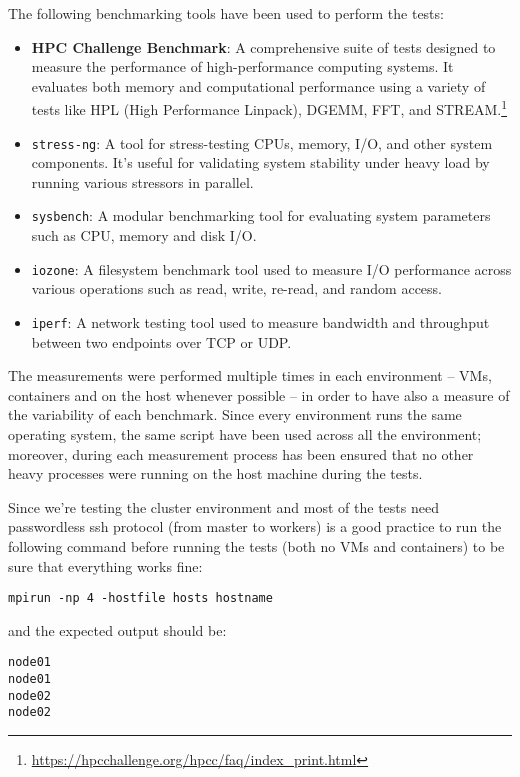 The following benchmarking tools have been used to perform the tests:

\begin{itemize}
    \item \textbf{HPC Challenge Benchmark}: A comprehensive suite of tests designed to measure the performance of high-performance computing systems. It evaluates both memory and computational performance using a variety of tests like HPL (High Performance Linpack), DGEMM, FFT, and STREAM.\footnote{\url{https://hpcchallenge.org/hpcc/faq/index_print.html}}
    \item \texttt{stress-ng}: A tool for stress-testing CPUs, memory, I/O, and other system components. It's useful for validating system stability under heavy load by running various stressors in parallel.
    \item \texttt{sysbench}: A modular benchmarking tool for evaluating system parameters such as CPU, memory and disk I/O.
    \item \texttt{iozone}: A filesystem benchmark tool used to measure I/O performance across various operations such as read, write, re-read, and random access.
    \item \texttt{iperf}: A network testing tool used to measure bandwidth and throughput between two endpoints over TCP or UDP. 
\end{itemize}

The measurements were performed multiple times in each environment -- VMs, containers and on the host whenever possible --  in order to have also a measure of the variability of each benchmark. Since every environment runs the same operating system, the same script have been used across all the environment; moreover, during each measurement process has been ensured that no other heavy processes were running on the host machine during the tests.\\

\par Since we're testing the cluster environment and most of the tests need passwordless ssh protocol (from master to workers) is a good practice to run the following command before running the tests (both no VMs and containers) to be sure that everything works fine:

\begin{verbatim}
mpirun -np 4 -hostfile hosts hostname
\end{verbatim}

and the expected output should be:

\begin{verbatim}
node01
node01
node02
node02
\end{verbatim}


